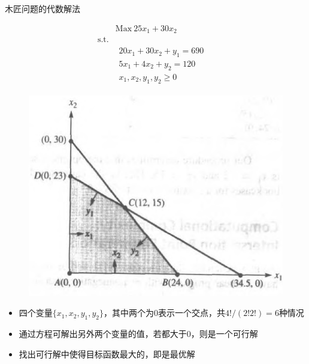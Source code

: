 \documentclass[UTF8]{ctexbeamer}
\begin{document}
\begin{frame}{木匠问题的代数解法}
  \begin{figure}
    \begin{minipage}{.5\linewidth}
      \[ 
      \begin{array}{lcl}
        & \mbox{Max}\ 25x_1 + 30x_2 & \\
        \mbox{s.t.} & &  \\
        &
        \begin{array}{c}
          20x_1 + 30x_2 + y_1 = 690\\
          5x_1 + 4x_2 + y_2 = 120\\
          x_1, x_2, y_1, y_2 \ge 0
        \end{array}
        &
      \end{array}
      \]
    \end{minipage}%
    \begin{minipage}{.5\linewidth}
      \includegraphics[width=\textwidth{}]{wood-var.png}
    \end{minipage}
  \end{figure}
  
  \begin{itemize}
  \item 四个变量$\{x_1, x_2, y_1, y_2\}$，其中两个为0表示一个交点，共$4!/(2!2!)=6$种情况
  \item 通过方程可解出另外两个变量的值，若都大于0，则是一个可行解
  \item 找出可行解中使得目标函数最大的，即是最优解
  \end{itemize}

\end{frame}
\end{document}
